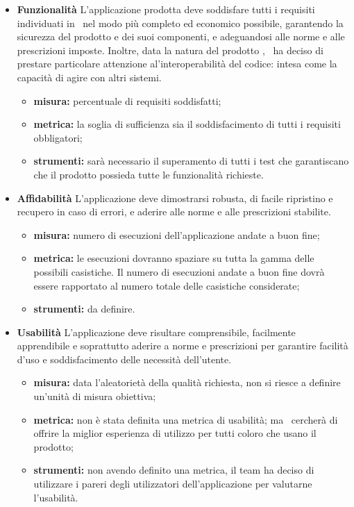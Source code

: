 \begin{itemize}
\item \textbf{Funzionalità}
L’applicazione prodotta deve soddisfare tutti i requisiti individuati in \infoAR ~nel modo più completo ed economico possibile, garantendo la sicurezza del prodotto e dei suoi componenti, e adeguandosi alle norme e alle prescrizioni imposte. Inoltre, data la natura del prodotto \progetto, \gruppo ~ha deciso di prestare particolare attenzione al'interoperabilità del codice: intesa come la capacità di agire con altri sistemi.
\begin{itemize}
\item \textbf{misura:} percentuale di requisiti soddisfatti;
\item \textbf{metrica:} la soglia di sufficienza sia il soddisfacimento di tutti i requisiti obbligatori;
\item \textbf{strumenti:} sarà necessario il superamento di tutti i test che garantiscano che il prodotto possieda tutte le funzionalità richieste.
\end{itemize}
\item \textbf{Affidabilità}
L’applicazione deve dimostrarsi robusta, di facile ripristino e recupero in caso di errori, e aderire alle norme e alle prescrizioni stabilite.
\begin{itemize}
\item \textbf{misura:} numero di esecuzioni dell'applicazione andate a buon fine;
\item \textbf{metrica:} le esecuzioni dovranno spaziare su tutta la gamma delle possibili casistiche. Il numero di esecuzioni andate a buon fine dovrà essere rapportato al numero totale delle casistiche considerate;
\item \textbf{strumenti:} da definire.
\end{itemize}
\item \textbf{Usabilità}
L’applicazione deve risultare comprensibile, facilmente apprendibile e soprattutto aderire a norme e prescrizioni per garantire facilità d’uso e soddisfacimento delle necessità dell’utente.
\begin{itemize}
\item \textbf{misura:} data l'aleatorietà della qualità richiesta, non si riesce a definire un'unità di misura obiettiva;
\item \textbf{metrica:} non è stata definita una metrica di usabilità; ma \gruppo ~cercherà di offrire la miglior esperienza di utilizzo per tutti coloro che usano il prodotto;
\item \textbf{strumenti:} non avendo definito una metrica, il team ha deciso di utilizzare i pareri degli utilizzatori dell'applicazione per valutarne l'usabilità.
\end{itemize}


\end{itemize}
